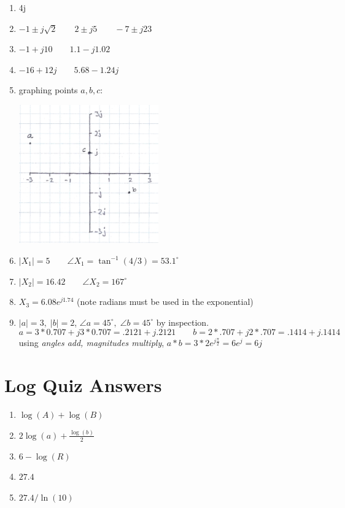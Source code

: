 \begin{enumerate}
\item 4j

\item $-1\pm j\sqrt{2} \qquad  2\pm j5 \qquad -7\pm j23  $

\item $-1+j10 \qquad 1.1-j1.02$

\item $-16+12j \qquad 5.68-1.24j$

\item graphing points $a,b,c$:

\includegraphics[width=6cm]{figsapdx/00927a.png}

\item $|X_1| = 5 \qquad \angle X_1 = \tan^{-1}(4/3) = 53.1^\circ$

\item $|X_2| = 16.42 \qquad \angle{X_2} = 167^\circ$

\item $X_3 = 6.08e^{j1.74}$ (note radians must be used in the exponential)

\item $|a| = 3, \; |b| = 2$,  $\angle a = 45^\circ,\; \angle b = 45^\circ$  by inspection.
\[
a = 3*0.707 + j3*0.707 = .2121+j.2121 \qquad b = 2*.707 + j2*.707 = .1414+j.1414
\]
using {\it angles add, magnitudes multiply}, $a*b = 3*2e^{j\frac{\pi}{2}} = 6e^j = 6j$

\end{enumerate}



\section{Log Quiz Answers}\label{Log_answers}


\begin{enumerate}

\item $\log(A) + \log(B)$

\item $2\log(a)+\frac{\log(b)}{2}$

\item $6-\log(R)$

\item $27.4$

\item $27.4/\ln(10)$

\end{enumerate}




